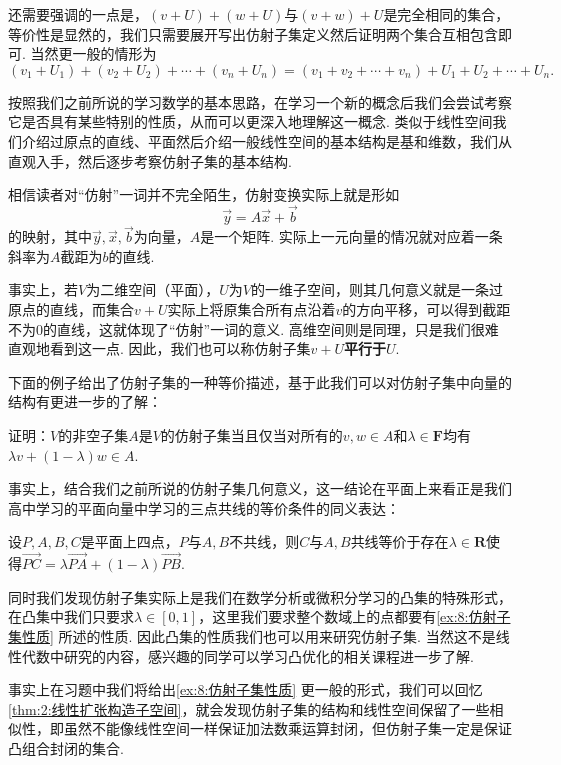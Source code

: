 还需要强调的一点是，$(v+U)+(w+U)$与$(v+w)+U$是完全相同的集合，等价性是显然的，我们只需要展开写出仿射子集定义然后证明两个集合互相包含即可. 当然更一般的情形为
\[(v_1+U_1)+(v_2+U_2)+\cdots+(v_n+U_n)=(v_1+v_2+\cdots+v_n)+U_1+U_2+\cdots+U_n.\]

按照我们之前所说的学习数学的基本思路，在学习一个新的概念后我们会尝试考察它是否具有某些特别的性质，从而可以更深入地理解这一概念. 类似于线性空间我们介绍过原点的直线、平面然后介绍一般线性空间的基本结构是基和维数，我们从直观入手，然后逐步考察仿射子集的基本结构.

相信读者对``仿射''一词并不完全陌生，仿射变换实际上就是形如\[\vec{y}=A\vec{x}+\vec{b}\]的映射，其中$\vec{y},\vec{x},\vec{b}$为向量，$A$是一个矩阵. 实际上一元向量的情况就对应着一条斜率为$A$截距为$b$的直线.

事实上，若$V$为二维空间（平面），$U$为$V$的一维子空间，则其几何意义就是一条过原点的直线，而集合$v+U$实际上将原集合所有点沿着$v$的方向平移，可以得到截距不为0的直线，这就体现了``仿射''一词的意义. 高维空间则是同理，只是我们很难直观地看到这一点. 因此，我们也可以称仿射子集$v+U$\textbf{\heiti 平行于}$U$.

下面的例子给出了仿射子集的一种等价描述，基于此我们可以对仿射子集中向量的结构有更进一步的了解：
\begin{example}\label{ex:8:仿射子集性质}
    证明：$V$的非空子集$A$是$V$的仿射子集当且仅当对所有的$v,w\in A$和$\lambda\in\mathbf{F}$均有$\lambda v+(1-\lambda)w\in A$.
\end{example}

\begin{solution}

\end{solution}

事实上，结合我们之前所说的仿射子集几何意义，这一结论在平面上来看正是我们高中学习的平面向量中学习的三点共线的等价条件的同义表达：
\begin{theorem}
    设$P,A,B,C$是平面上四点，$P$与$A,B$不共线，则$C$与$A,B$共线等价于存在$\lambda\in\mathbf{R}$使得$\overrightarrow{PC}=\lambda\overrightarrow{PA}+(1-\lambda)\overrightarrow{PB}$.
\end{theorem}
同时我们发现仿射子集实际上是我们在数学分析或微积分学习的凸集的特殊形式，在凸集中我们只要求$\lambda\in[0,1]$，这里我们要求整个数域上的点都要有\autoref{ex:8:仿射子集性质} 所述的性质. 因此凸集的性质我们也可以用来研究仿射子集. 当然这不是线性代数中研究的内容，感兴趣的同学可以学习凸优化的相关课程进一步了解.

事实上在习题中我们将给出\autoref*{ex:8:仿射子集性质} 更一般的形式，我们可以回忆\autoref{thm:2:线性扩张构造子空间}，就会发现仿射子集的结构和线性空间保留了一些相似性，即虽然不能像线性空间一样保证加法数乘运算封闭，但仿射子集一定是保证凸组合封闭的集合.

